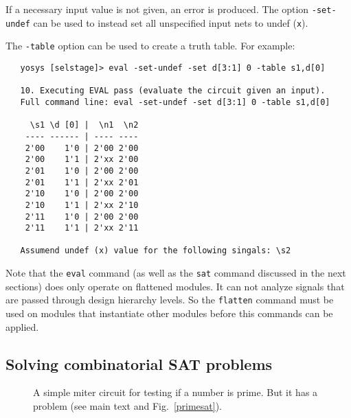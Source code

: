 \documentclass[9pt,technote,a4paper]{IEEEtran}
\begin{document}
If a necessary input value is not given, an error is produced. The option
{\tt -set-undef} can be used to instead set all unspecified input nets to
undef ({\tt x}).

The {\tt -table} option can be used to create a truth table. For example:

{\scriptsize
\begin{verbatim}
   yosys [selstage]> eval -set-undef -set d[3:1] 0 -table s1,d[0]
   
   10. Executing EVAL pass (evaluate the circuit given an input).
   Full command line: eval -set-undef -set d[3:1] 0 -table s1,d[0]
   
     \s1 \d [0] |  \n1  \n2
    ---- ------ | ---- ----
    2'00    1'0 | 2'00 2'00
    2'00    1'1 | 2'xx 2'00
    2'01    1'0 | 2'00 2'00
    2'01    1'1 | 2'xx 2'01
    2'10    1'0 | 2'00 2'00
    2'10    1'1 | 2'xx 2'10
    2'11    1'0 | 2'00 2'00
    2'11    1'1 | 2'xx 2'11
   
   Assumend undef (x) value for the following singals: \s2
\end{verbatim}
}

Note that the {\tt eval} command (as well as the {\tt sat} command discussed in
the next sections) does only operate on flattened modules. It can not analyze
signals that are passed through design hierarchy levels. So the {\tt flatten}
command must be used on modules that instantiate other modules before this
commands can be applied.

\subsection{Solving combinatorial SAT problems}

\begin{figure}[b]

\caption{A simple miter circuit for testing if a number is prime. But it has a
problem (see main text and Fig.~\ref{primesat}).}
\label{primetest}
\end{figure}
\end{document}
